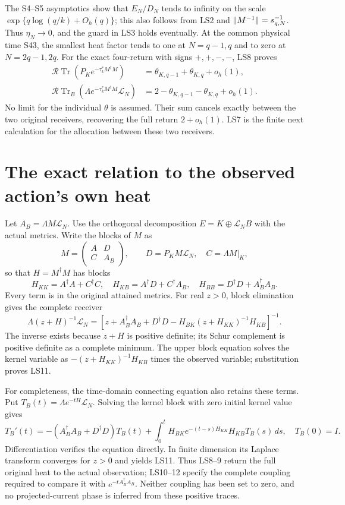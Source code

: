 \documentclass[11pt]{article}
\providecommand{\Tr}{\operatorname{Tr}}\providecommand{\Pp}{\mathcal P}
\begin{document}
The S4--S5 asymptotics show that $E_N/D_N$ tends to infinity
on the scale $\exp\{q\log(q/k)+O_h(q)\}$; this also follows
from LS2 and $\lVert M^{-1}\rVert=s_{q,N}^{-1}$.
Thus $\eta_N\to0$, and the guard in LS3 holds eventually.
At the common physical time S43, the smallest heat factor tends
to one at $N=q-1,q$ and to zero at $N=2q-1,2q$.
For the exact four-return with signs $+,+,-,-$, LS8 proves
\[
\boxed{\begin{aligned}
\mathcal R\Tr(P_K e^{-\tau_k^*M^\dagger M})
 &=\theta_{K,q-1}+\theta_{K,q}+o_h(1),\\
\mathcal R\Tr_B(\Lambda e^{-\tau_k^*M^\dagger M}\mathcal L_N)
 &=2-\theta_{K,q-1}-\theta_{K,q}+o_h(1).
\end{aligned}}\tag{LS9}
\]
No limit for the individual $\theta$ is assumed. Their sum
cancels exactly between the two original receivers, recovering
the full return $2+o_h(1)$. LS7 is the finite next calculation
for the allocation between these two receivers.

\section{The exact relation to the observed action's own heat}
Let $A_B=\Lambda M\mathcal L_N$. Use the orthogonal decomposition
$E=K\oplus\mathcal L_NB$ with the actual metrics. Write the blocks
of $M$ as
\[
M=\begin{pmatrix}A&D\\ C&A_B\end{pmatrix},\qquad
D=P_KM\mathcal L_N,\quad C=\Lambda M|_K,
\]
so that $H=M^\dagger M$ has blocks
\[
H_{KK}=A^\dagger A+C^\dagger C,\quad
H_{KB}=A^\dagger D+C^\dagger A_B,\quad
H_{BB}=D^\dagger D+A_B^\dagger A_B.
\tag{LS10}
\]
Every term is in the original attained metrics.
For real $z>0$, block elimination gives the complete receiver
\[
\boxed{\Lambda(z+H)^{-1}\mathcal L_N
=\left[z+A_B^\dagger A_B+D^\dagger D
-H_{BK}(z+H_{KK})^{-1}H_{KB}\right]^{-1}.}
\tag{LS11}
\]
The inverse exists because $z+H$ is positive definite; its
Schur complement is positive definite as a complete minimum.
The upper block equation solves the kernel variable as
$-(z+H_{KK})^{-1}H_{KB}$ times the observed variable;
substitution proves LS11.

For completeness, the time-domain connecting equation also retains
these terms. Put $T_B(t)=\Lambda e^{-tH}\mathcal L_N$.
Solving the kernel block with zero initial kernel value gives
\[
\boxed{T_B'(t)=-(A_B^\dagger A_B+D^\dagger D)T_B(t)
+\int_0^tH_{BK}e^{-(t-s)H_{KK}}H_{KB}T_B(s)\,ds,\quad T_B(0)=I.}
\tag{LS12}
\]
Differentiation verifies the equation directly. In finite dimension
its Laplace transform converges for $z>0$ and yields LS11.
Thus LS8--9 return the full original heat to the actual observation;
LS10--12 specify the complete coupling required to compare it with
$e^{-tA_B^\dagger A_B}$. Neither coupling has been set to zero,
and no projected-current phase is inferred from these positive traces.
\end{document}
